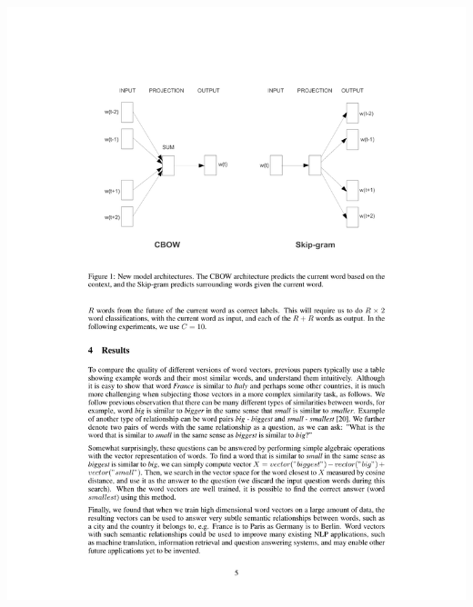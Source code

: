 \documentclass{beamer}
\begin{document}
\begin{frame}
\includegraphics[width=\linewidth]{mikolov-cbow-skip}
\end{frame}
\end{document}
